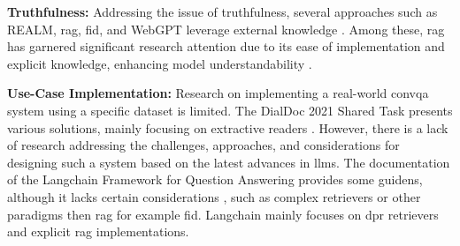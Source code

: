 \vspace{\baselineskip}
\noindent\textbf{Truthfulness:} Addressing the issue of truthfulness, several approaches such as REALM, \gls{rag}, \gls{fid}, and WebGPT leverage external knowledge \cite{guu_realm_2020, lewis_retrieval-augmented_2021, izacard_leveraging_2021, nakano_webgpt_2022}. Among these, \gls{rag} has garnered significant research attention due to its ease of implementation and explicit knowledge, enhancing model understandability \cite{gao_retrieval-augmented_2024}.

\vspace{\baselineskip}
\noindent\textbf{Use-Case Implementation:} Research on implementing a real-world \gls{convqa} system using a specific dataset is limited. The DialDoc 2021 Shared Task presents various solutions, mainly focusing on extractive readers \cite{feng_dialdoc_2021}. However, there is a lack of research addressing the challenges, approaches, and considerations for designing such a system based on the latest advances in \gls{llm}s. The documentation of the Langchain Framework for Question Answering provides some guidens, although it lacks certain considerations \cite{noauthor_question_nodate}, such as complex retrievers or other paradigms then \gls{rag} for example \gls{fid}. Langchain mainly focuses on \gls{dpr} retrievers and explicit \gls{rag} implementations.
